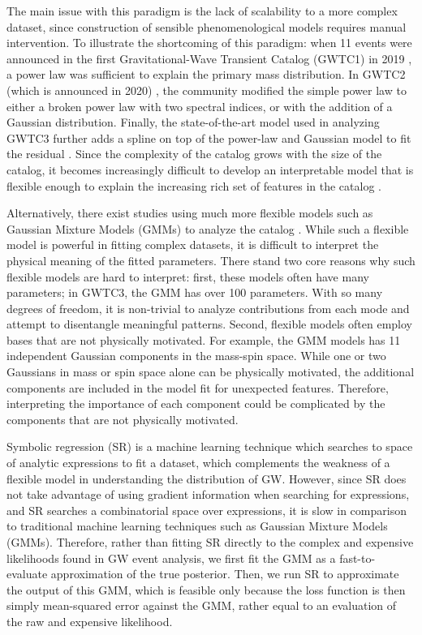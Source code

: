 \documentclass[nohyperref]{article}
\theoremstyle{plain}
\theoremstyle{definition}
\theoremstyle{remark}
\begin{document}
The main issue with this paradigm is the lack of scalability to a more complex dataset, since construction of sensible phenomenological models requires manual intervention.
To illustrate the shortcoming of this paradigm: 
when 11 events were announced in the first Gravitational-Wave Transient Catalog (GWTC1) in 2019 \cite{LIGOScientific:2018mvr}, a power law was sufficient to explain the primary mass distribution.
In GWTC2 (which is announced in 2020) \cite{LIGOScientific:2020kqk}, the community modified the simple power law to either a broken power law with two spectral indices, or with the addition of a Gaussian distribution.
Finally, the state-of-the-art model used in analyzing GWTC3 \cite{LIGOScientific:2021psn} further adds a spline on top of the power-law and Gaussian model to fit the residual \cite{Edelman:2021zkw}.
Since the complexity of the catalog grows with the size of the catalog,
it becomes increasingly difficult to develop an interpretable model that is flexible enough to explain the increasing rich set of features in the catalog . 

Alternatively, there exist studies using much more flexible models such as  Gaussian Mixture Models (GMMs) to analyze the catalog \cite{Tiwari:2020vym}.
While such a flexible model is powerful in fitting complex datasets,
it is difficult to interpret the physical meaning of the fitted parameters.
There stand two core reasons why such flexible models are hard to interpret:
first, these models often have many parameters;
in GWTC3, the GMM has over 100 parameters.
With so many degrees of freedom, it is non-trivial to analyze contributions from each mode and attempt to disentangle meaningful patterns.
Second, flexible models often employ bases that are not physically motivated.
For example, the GMM models has 11 independent Gaussian components in the mass-spin space.
While one or two Gaussians in mass or spin space alone can be physically motivated,
the additional components are included in the model fit for unexpected features.
Therefore, interpreting the importance of each component could be complicated by the components that are not physically motivated.

Symbolic regression (SR) is a machine learning technique which searches to space of analytic expressions to fit a dataset, which complements the weakness of a flexible model in understanding the distribution of GW.
However, since SR does not take advantage of using gradient information when searching for expressions,
and  SR searches a combinatorial space over expressions,
it is slow in comparison to traditional machine learning techniques such as Gaussian Mixture Models (GMMs).
Therefore, rather than fitting SR directly to the complex and expensive likelihoods found in GW event analysis, we first fit the GMM as a fast-to-evaluate approximation of the true posterior.
Then, we run SR to approximate the output of this GMM, which is feasible only because the loss function is then simply mean-squared error against the GMM, rather equal to an evaluation of the raw and expensive likelihood.
\end{document}
